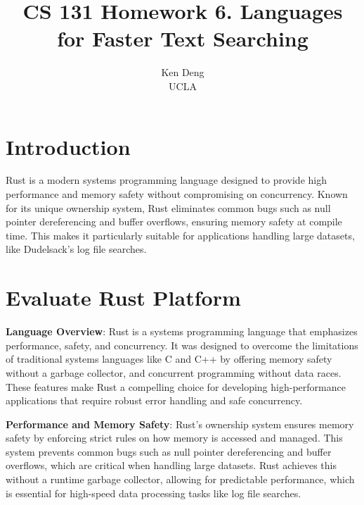 \documentclass[letterpaper,twocolumn,10pt]{article}
\begin{document}

\date{}

\title{\Large \bf CS 131 Homework 6. Languages for Faster Text Searching}

\author{
{Ken Deng}\\
UCLA
} %

\maketitle

\section{Introduction}
Rust is a modern systems programming language designed to provide high performance and memory safety without compromising on concurrency. Known for its unique ownership system, Rust eliminates common bugs such as null pointer dereferencing and buffer overflows, ensuring memory safety at compile time. This makes it particularly suitable for applications handling large datasets, like Dudelsack’s log file searches.
\section{Evaluate Rust Platform}
\noindent \textbf{Language Overview}: Rust is a systems programming language that emphasizes performance, safety, and concurrency. It was designed to overcome the limitations of traditional systems languages like C and C++ by offering memory safety without a garbage collector, and concurrent programming without data races. These features make Rust a compelling choice for developing high-performance applications that require robust error handling and safe concurrency.

\noindent \textbf{Performance and Memory Safety}: Rust’s ownership system ensures memory safety by enforcing strict rules on how memory is accessed and managed. This system prevents common bugs such as null pointer dereferencing and buffer overflows, which are critical when handling large datasets. Rust achieves this without a runtime garbage collector, allowing for predictable performance, which is essential for high-speed data processing tasks like log file searches.
\end{document}
